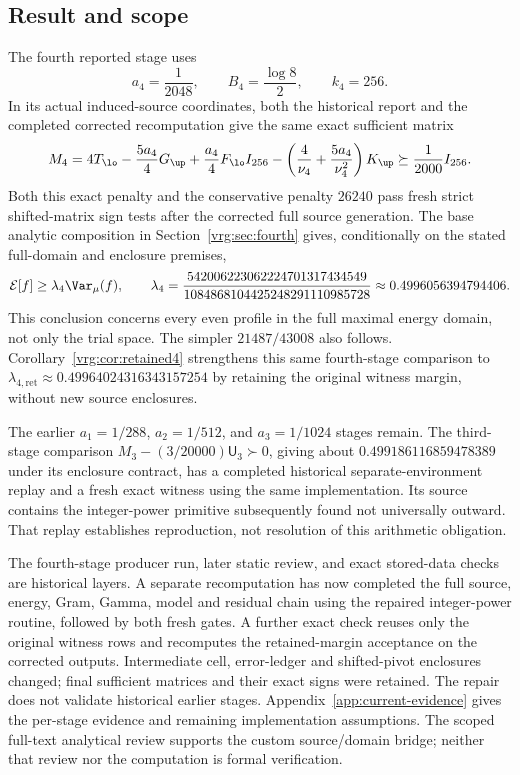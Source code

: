 \documentclass[11pt,a4paper]{article}
\numberwithin{equation}{section}
\theoremstyle{definition}\newtheorem{definition}[theorem]{Definition}
\theoremstyle{remark}\newtheorem{remark}[theorem]{Remark}
\newcommand{\E}{\mathcal E}\newcommand{\D}{\mathcal D}
\begin{document}
\subsection{Result and scope}
The fourth reported stage uses
\[
a_4=\frac1{2048},\qquad B_4=\frac{\log8}{2},\qquad k_4=256.
\]
In its actual induced-source coordinates, both the historical report and the completed corrected recomputation give the same exact sufficient matrix
\begin{equation}\label{vrg:eq:headline}
M_4=4T_{\lo}-\frac{5a_4}{4}G_{\up}
 +\frac{a_4}{4}F_{\lo}I_{256}
 -\left(\frac4{\nu_4}+\frac{5a_4}{\nu_4^2}\right)K_{\up}
 \succeq\frac1{2000}I_{256}.
\end{equation}
Both this exact penalty and the conservative penalty \(26240\) pass fresh
strict shifted-matrix sign tests after the corrected full source generation. The base analytic composition in
Section~\ref{vrg:sec:fourth} gives, conditionally on the stated full-domain and
enclosure premises,
\begin{equation}\label{vrg:eq:lambda4}
\E[f]\geq\lambda_4\Var_\mu(f),\qquad
\lambda_4=\frac{542006223062224701317434549}{1084868104425248291110985728}
 \approx0.4996056394794406.
\end{equation}
This conclusion concerns every even profile in the full maximal energy
domain, not only the trial space. The simpler \(21487/43008\) also follows. Corollary~\ref{vrg:cor:retained4} strengthens this same fourth-stage comparison to $\lambda_{4,\mathrm{ret}}\approx0.49964024316343157254$ by retaining the original witness margin, without new source enclosures.

The earlier \(a_1=1/288\), \(a_2=1/512\), and \(a_3=1/1024\) stages remain.
The third-stage comparison \(M_3-(3/20000)\mathsf U_3\succ0\), giving
about \(0.499186116859478389\) under its enclosure contract, has a completed
historical separate-environment replay and a fresh exact witness using the
same implementation. Its source contains the integer-power primitive
subsequently found not universally outward. That replay establishes
reproduction, not resolution of this arithmetic obligation.

The fourth-stage producer run, later static review, and exact stored-data
checks are historical layers. A separate recomputation has now completed
the full source, energy, Gram, Gamma, model and residual chain using the
repaired integer-power routine, followed by both fresh gates. A further
exact check reuses only the original witness rows and recomputes the
retained-margin acceptance on the corrected outputs. Intermediate
cell, error-ledger and shifted-pivot enclosures changed; final sufficient
matrices and their exact signs were retained. The repair does not validate
historical earlier stages. Appendix~\ref{app:current-evidence} gives the
per-stage evidence and remaining implementation assumptions. The scoped
full-text analytical review supports the custom source/domain bridge;
neither that review nor the computation is formal verification.
\end{document}
